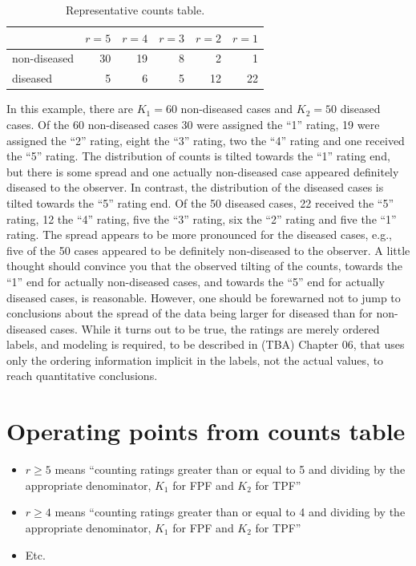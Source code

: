 \documentclass[
]{book}
\providecommand{\tightlist}{%
  \setlength{\itemsep}{0pt}\setlength{\parskip}{0pt}}
\begin{document}
\begin{table}

\caption{\label{tab:ratingsParadigmTable1}Representative counts table.}
\centering
\begin{tabular}[t]{l|r|r|r|r|r}
\hline
  & $r = 5$ & $r = 4$ & $r = 3$ & $r = 2$ & $r = 1$\\
\hline
non-diseased & 30 & 19 & 8 & 2 & 1\\
\hline
diseased & 5 & 6 & 5 & 12 & 22\\
\hline
\end{tabular}
\end{table}

In this example, there are \(K_1 = 60\) non-diseased cases and \(K_2 = 50\) diseased cases. Of the 60 non-diseased cases 30 were assigned the ``1'' rating, 19 were assigned the ``2'' rating, eight the ``3'' rating, two the ``4'' rating and one received the ``5'' rating. The distribution of counts is tilted towards the ``1'' rating end, but there is some spread and one actually non-diseased case appeared definitely diseased to the observer. In contrast, the distribution of the diseased cases is tilted towards the ``5'' rating end. Of the 50 diseased cases, 22 received the ``5'' rating, 12 the ``4'' rating, five the ``3'' rating, six the ``2'' rating and five the ``1'' rating. The spread appears to be more pronounced for the diseased cases, e.g., five of the 50 cases appeared to be definitely non-diseased to the observer. A little thought should convince you that the observed tilting of the counts, towards the ``1'' end for actually non-diseased cases, and towards the ``5'' end for actually diseased cases, is reasonable. However, one should be forewarned not to jump to conclusions about the spread of the data being larger for diseased than for non-diseased cases. While it turns out to be true, the ratings are merely ordered labels, and modeling is required, to be described in (TBA) Chapter 06, that uses only the ordering information implicit in the labels, not the actual values, to reach quantitative conclusions.

\hypertarget{operating-points-from-counts-table}{%
\section{Operating points from counts table}\label{operating-points-from-counts-table}}

\begin{itemize}
\tightlist
\item
  \(r\ge 5\) means ``counting ratings greater than or equal to 5 and dividing by the appropriate denominator, \(K_1\) for FPF and \(K_2\) for TPF''
\item
  \(r\ge 4\) means ``counting ratings greater than or equal to 4 and dividing by the appropriate denominator, \(K_1\) for FPF and \(K_2\) for TPF''
\item
  Etc.
\end{itemize}
\end{document}
